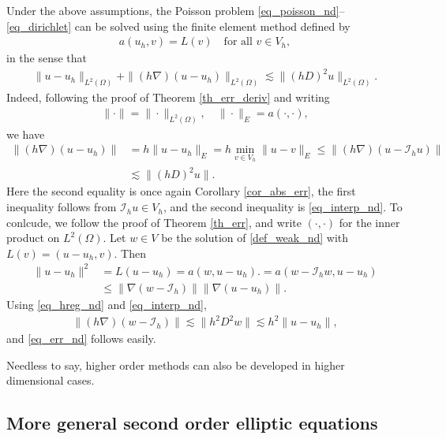 \documentclass[12pt,oneside,final]{amsart}
\def\I{\mathcal I}
\begin{document}
Under the above assumptions, the Poisson problem \eqref{eq_poisson_nd}--\eqref{eq_dirichlet} can be solved using the finite element method defined by
    \begin{align}\label{def_fem_nd}
a(u_h,v) = L(v) \quad \text{for all $v \in V_h$},
    \end{align}
in the sense that 
    \begin{align}\label{eq_err_nd}
\|u - u_h\|_{L^2(\Omega)} + \|(h\nabla)(u - u_h)\|_{L^2(\Omega)}
\lesssim \|(hD)^2 u\|_{L^2(\Omega)}.
    \end{align}
Indeed, following the proof of Theorem \ref{th_err_deriv} and writing
    \begin{align*}
\|\cdot\| = \|\cdot\|_{L^2(\Omega)},
\quad 
\|\cdot\|_E = a(\cdot, \cdot),
    \end{align*}
we have 
    \begin{align*}
\|(h\nabla)(u-u_h)\|
&= 
h\|u-u_h\|_E 
= 
h \min_{v \in V_h}\|u-v\|_E
\le 
\|(h\nabla)(u-\I_h u)\|
\\&\lesssim
\|(hD)^2 u\|.
    \end{align*}
Here the second equality is once again Corollary \ref{cor_abs_err},
the first inequality follows from $\I_h u \in V_h$, and the second inequality is \eqref{eq_interp_nd}. 
To conlcude, we follow the proof of Theorem \ref{th_err}, 
and write $(\cdot, \cdot)$ for the inner product on $L^2(\Omega)$.
Let $w \in V$ be the solution of \eqref{def_weak_nd} with $L(v) = (u - u_h,v)$. Then 
    \begin{align*}
\|u-u_h\|^2 
&= 
L(u - u_h) 
= 
a(w, u - u_h).
= 
a(w - \I_h w, u - u_h) 
\\&\le 
\|\nabla(w - \I_h)\|\|\nabla(u-u_h)\|.
    \end{align*}
Using \eqref{eq_hreg_nd} and \eqref{eq_interp_nd},
    \begin{align*}
\|(h\nabla)(w - \I_h)\| 
\lesssim
\|h^2 D^2 w\|
\lesssim 
h^2 \|u - u_h\|,
    \end{align*}
and \eqref{eq_err_nd} follows easily.

Needless to say, higher order methods can also be developed in higher dimensional cases. 

\subsection{More general second order elliptic equations}
\end{document}
